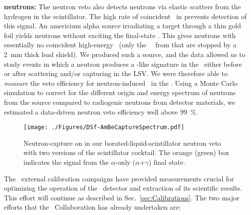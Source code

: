 {\bf {} neutrons:} The neutron veto also detects   neutrons via elastic scatters from the hydrogen in the scintillator.  The high rate of coincident \grs\ in  prevents detection of this signal.  An americium alpha source irradiating a  target through  a thin gold foil yields neutrons without exciting the final-state .  This gives neutrons with essentially no coincident high-energy \grs\ (only the \AmTwoFourGammaOneEnergy\ \grs\ from  that are stopped by a \SI{2}{\milli\meter} thick lead shield).  We produced such a source, and the  data allowed us to study events in which a neutron produces a \WIMP-like signature in the \LArTPC\ either before or after scattering and/or capturing in the LSV.  We were therefore able to {\it measure} the veto efficiency for neutron-induced \NRs\ in the \LArTPC.  Using a Monte Carlo simulation to correct for the different origin and energy spectrum of neutrons from the source compared to radiogenic neutrons from detector materials, we estimated a data-driven neutron veto efficiency well above \SI{99}{\percent}.

\begin{figure}[!t]
\begin{center}
\texttt{[image: ./Figures/DSf-AmBeCaptureSpectrum.pdf]}
\end{center}
\caption{Neutron-capture on  in our borated-liquid-scintillator neutron veto with two versions of the scintillator cocktail.  The orange (green) box indicates the signal from the $\alpha$-only ($\alpha$+$\gamma$) final state.}
\label{fig:DSf-AmBeCaptureSpectrum} 
\end{figure}

The \DSs\ external calibration campaigns have provided measurements crucial for optimizing the operation of the \DSfs\ detector and extraction of its scientific results. This effort will continue as described in Sec.~\ref{sec:Calibrations}. The two major efforts that the \DSs\ Collaboration has already undertaken are:

